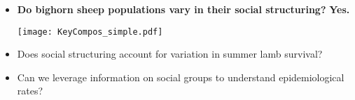 \documentclass[fleqn,xcolor=table]{beamer}
\begin{document}
{
\begin{frame}[t]
	\begin{itemize}
		\item[] \color{navy} \footnotesize \textbf{Do bighorn sheep populations vary in their social
			structuring?}
			\vspace{.1in}
			\color{darkred} \textbf{Yes.}

			\texttt{[image: KeyCompos\_simple.pdf]}
			\vspace{.1in}
		\item[] \color{navy} \footnotesize Does social structuring account for variation in
			summer lamb survival?
			\vspace{.8in}
		\item[] \color{navy} \footnotesize Can we leverage information on social groups to 
			understand epidemiological rates?
	\end{itemize}
\end{frame}
}
%
\end{document}
